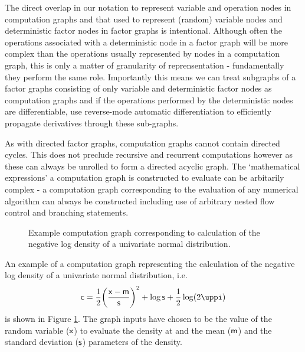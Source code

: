 The direct overlap in our notation to represent variable and operation nodes in computation graphs and that used to represent (random) variable nodes and deterministic factor nodes in factor graphs is intentional. Although often the operations associated with a deterministic node in a factor graph will be more complex than the operations usually represented by nodes in a computation graph, this is only a matter of granularity of reprensentation - fundamentally they perform the same role. Importantly this means we can treat subgraphs of a factor graphs consisting of only variable and deterministic factor nodes as computation graphs and if the operations performed by the deterministic nodes are differentiable, use reverse-mode automatic differentiation to efficiently propagate derivatives through these sub-graphs.

As with directed factor graphs, computation graphs cannot contain directed cycles. This does not preclude recursive and recurrent computations however as these can always be unrolled to form a directed acyclic graph. The `mathematical expressions' a computation graph is constructed to evaluate can be arbitarily complex - a computation graph corresponding to the evaluation of any numerical algorithm can always be constructed including use of arbitrary nested flow control and branching statements.

\begin{figure}[!t]
\vskip 0pt
\centering
{}
\vskip 0pt
\caption[Example computation graph.]{Example computation graph corresponding to calculation of the negative log density of a univariate normal distribution.
}
\label{fig:gaussian-density-computation-graph}
\end{figure}

An example of a computation graph representing the calculation of the negative log density of a univariate normal distribution, i.e.
\begin{equation}\label{eq:gaussian-nld-computation-graph-expression}
  \rvar{c} =
  \frac{1}{2}\lpa\frac{\rvar{x} - \rvar{m}}{\rvar{s}}\rpa^2 + \log\rvar{s} + \frac{1}{2}\log(2\uppi)
\end{equation}
is shown in Figure \ref{fig:gaussian-density-computation-graph}. The graph inputs have chosen to be the value of the random variable ($\mathsf{x}$) to evaluate the density at and the mean ($\mathsf{m}$) and the standard deviation ($\mathsf{s}$) parameters of the density. %

